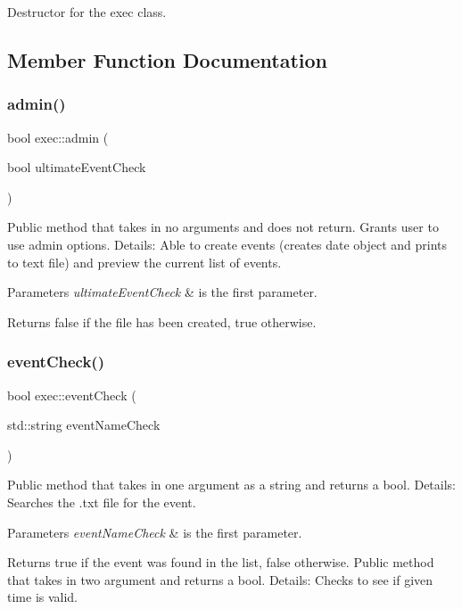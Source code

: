 Destructor for the exec class. 

\subsection{Member Function Documentation}
\mbox{\label{classexec_ab114315e1bb0daff8f96dc03e7c88392}} 
\subsubsection{\texorpdfstring{admin()}{admin()}}
{\footnotesize\ttfamily bool exec\+::admin (\begin{DoxyParamCaption}\item[{bool}]{ultimate\+Event\+Check }\end{DoxyParamCaption})}

Public method that takes in no arguments and does not return. Grants user to use admin options. Details\+: Able to create events (creates date object and prints to text file) and preview the current list of events. 
\begin{DoxyParams}{Parameters}
{\em ultimate\+Event\+Check} & is the first parameter. \\
\hline
\end{DoxyParams}
\begin{DoxyReturn}{Returns}
false if the file has been created, true otherwise. 
\end{DoxyReturn}
\mbox{\label{classexec_abf1c735a300deae3f5de4bf6891f2190}} 
\subsubsection{\texorpdfstring{event\+Check()}{eventCheck()}}
{\footnotesize\ttfamily bool exec\+::event\+Check (\begin{DoxyParamCaption}\item[{std\+::string}]{event\+Name\+Check }\end{DoxyParamCaption})}

Public method that takes in one argument as a string and returns a bool. Details\+: Searches the .txt file for the event. 
\begin{DoxyParams}{Parameters}
{\em event\+Name\+Check} & is the first parameter. \\
\hline
\end{DoxyParams}
\begin{DoxyReturn}{Returns}
true if the event was found in the list, false otherwise. Public method that takes in two argument and returns a bool. Details\+: Checks to see if given time is valid. 
\end{DoxyReturn}

